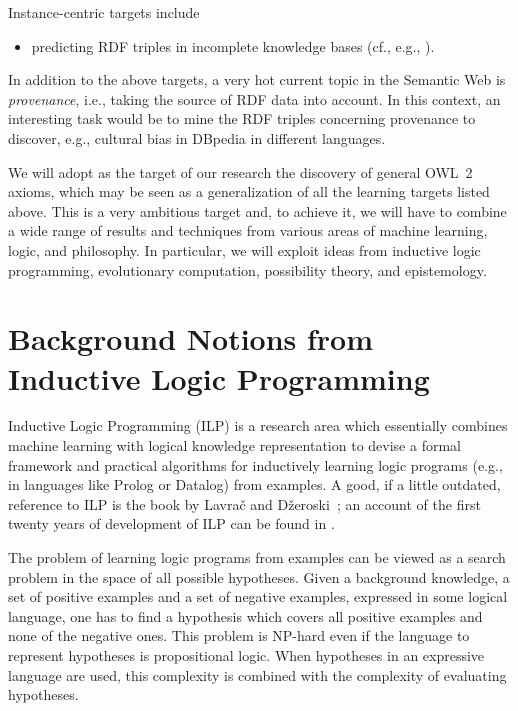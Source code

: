 \documentclass[a4paper]{article}
\newcounter{ex}
\begin{document}
Instance-centric targets include
\begin{itemize}
\item predicting RDF triples in incomplete knowledge bases
(cf., e.g., \cite{DrumondRendleSchmiedtThieme2012}).
\end{itemize}

In addition to the above targets, a very hot current topic in the Semantic Web is
\emph{provenance}, i.e., taking the source of RDF data into account. In this
context, an interesting task would be to mine the RDF triples concerning provenance
to discover, e.g., cultural bias in DBpedia in different languages.

We will adopt as the target of our research the discovery of general OWL~2 axioms,
which may be seen as a generalization of all the learning targets listed above.
This is a very ambitious target and, to achieve it, we will have to combine a wide range
of results and techniques from various areas of machine learning, logic, and philosophy.
In particular, we will exploit ideas from inductive logic programming,
evolutionary computation, possibility theory, and epistemology.

\section{Background Notions from Inductive Logic Programming}
\label{ILP}

Inductive Logic Programming (ILP) is a research area which essentially combines
machine learning with logical knowledge representation to devise a formal framework
and practical algorithms for inductively learning logic programs
(e.g., in languages like Prolog or Datalog) from examples.
A good, if a little outdated, reference to ILP is the book by Lavra\v c and D\v zeroski~\cite{LavracDzeroski1994}; an account of the first twenty years of development of ILP
can be found in \cite{ILPat20}.

The problem of learning logic programs from examples can be viewed as a search problem
in the space of all possible hypotheses. Given a background knowledge, a set of positive
examples and a set of negative examples, expressed in some logical language,
one has to find a hypothesis which covers all positive examples and none of the negative ones.
This problem is NP-hard even if the language to represent hypotheses is propositional logic.
When hypotheses in an expressive language are used, this complexity is combined
with the complexity of evaluating hypotheses.
\end{document}
